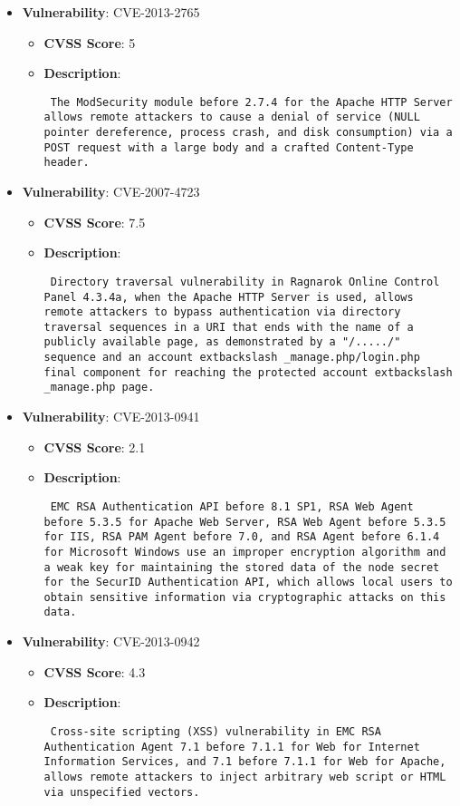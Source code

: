 \documentclass{article}
\begin{document}
\begin{itemize}
        \item \textbf{Vulnerability}: CVE-2013-2765
        \begin{itemize}
            \item \textbf{CVSS Score}:  5 
            \item \textbf{Description}: \parbox{\linewidth}{\texttt{ The ModSecurity module before 2.7.4 for the Apache HTTP Server allows remote attackers to cause a denial of service (NULL pointer dereference, process crash, and disk consumption) via a POST request with a large body and a crafted Content-Type header. }}
        \end{itemize}
    
        \item \textbf{Vulnerability}: CVE-2007-4723
        \begin{itemize}
            \item \textbf{CVSS Score}:  7.5 
            \item \textbf{Description}: \parbox{\linewidth}{\texttt{ Directory traversal vulnerability in Ragnarok Online Control Panel 4.3.4a, when the Apache HTTP Server is used, allows remote attackers to bypass authentication via directory traversal sequences in a URI that ends with the name of a publicly available page, as demonstrated by a "/...../" sequence and an account	extbackslash _manage.php/login.php final component for reaching the protected account	extbackslash _manage.php page. }}
        \end{itemize}
    
        \item \textbf{Vulnerability}: CVE-2013-0941
        \begin{itemize}
            \item \textbf{CVSS Score}:  2.1 
            \item \textbf{Description}: \parbox{\linewidth}{\texttt{ EMC RSA Authentication API before 8.1 SP1, RSA Web Agent before 5.3.5 for Apache Web Server, RSA Web Agent before 5.3.5 for IIS, RSA PAM Agent before 7.0, and RSA Agent before 6.1.4 for Microsoft Windows use an improper encryption algorithm and a weak key for maintaining the stored data of the node secret for the SecurID Authentication API, which allows local users to obtain sensitive information via cryptographic attacks on this data. }}
        \end{itemize}
    
        \item \textbf{Vulnerability}: CVE-2013-0942
        \begin{itemize}
            \item \textbf{CVSS Score}:  4.3 
            \item \textbf{Description}: \parbox{\linewidth}{\texttt{ Cross-site scripting (XSS) vulnerability in EMC RSA Authentication Agent 7.1 before 7.1.1 for Web for Internet Information Services, and 7.1 before 7.1.1 for Web for Apache, allows remote attackers to inject arbitrary web script or HTML via unspecified vectors. }}
        \end{itemize}
    

\end{itemize}
\end{document}
